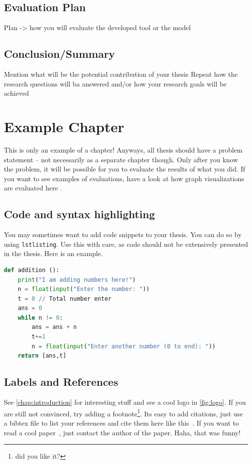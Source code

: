 \documentclass{imc-inf}
\begin{document}
\section{Evaluation Plan}
Plan -> how you will evaluate the developed tool or the model

\section{Conclusion/Summary}

Mention what will be the potential contribution of your thesis
Repeat how the research questions will ba answered and/or how your research goals will be achieved


\chapter{Example Chapter}
This is only an example of a chapter! Anyways, all thesis should have a problem statement -- not necessarily as a separate chapter though. Only after you know the problem, it will be possible for you to evaluate the results of what you did. If you want to see examples of evaluations, have a look at how graph visualizations are evaluated here \cite{DBLP:journals/access/BurchHWPWH21}. 

\section{Code and syntax highlighting}

You may sometimes want to add code snippets to your thesis. You can do so by using \texttt{lstlisting}. Use this with care, as code should not be extensively presented in the thesis. Here is an example. 

\begin{lstlisting}[language=Python]
def addition ():
    print("I am adding numbers here!")
    n = float(input("Enter the number: "))
    t = 0 // Total number enter
    ans = 0
    while n != 0:
        ans = ans + n
        t+=1
        n = float(input("Enter another number (0 to end): "))
    return [ans,t]
\end{lstlisting}

\section{Labels and References}
See \autoref{chap:introduction} for interesting stuff and see a cool logo in \autoref{fig:logo}. If you are still not convinced, try adding a footnote\footnote{did you like it?}. Its easy to add citations, just use a bibtex file to list your references and cite them here like this~\cite{988366}. If you want to read a cool paper~\cite{DBLP:conf/euromicro/DhunganaHW20}, just contact the author of the paper. Haha, that was funny! 
\end{document}

